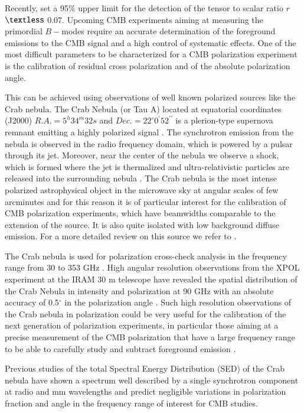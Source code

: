 \documentclass[twocolumn,traditabstract]{aa}
\begin{document}
Recently, \citet{bicepplanck2015,bicep2016} set a 95\% upper limit for the
detection of the tensor to scalar ratio $r$ $\textless$ 0.07.  Upcoming CMB
experiments aiming at measuring the primordial $B-$modes require an accurate
determination of the foreground emissions to the CMB signal and a high control
of systematic effects. One of the most difficult parameters to be characterized for
a CMB polarization experiment is the calibration of residual cross polarization
and of the absolute polarization angle.

This can be achieved using observations of well known polarized sources like the
Crab nebula. The Crab Nebula (or Tau A) located at equatorial coordinates (J2000)
$R.A. = 5^h34^m32s$ and $Dec. = 22^{\circ}0^{\prime}52^{\prime\prime}$ is a
plerion-type supernova remnant emitting a highly polarized signal
\citep{1978A&A....70..419W,1991ApJ...368..463M}.  The synchrotron emission from
the nebula is observed in the radio frequency domain, which is powered by a
pulsar through its jet.  Moreover, near the center of the nebula we observe a
shock, which is formed where the jet is thermalized and ultra-relativistic
particles are released into the surrounding nebula
\citep{2000ApJ...536L..81W,2011A&A...528A..11W}. The Crab nebula is the most
intense polarized astrophysical object in the microwave sky at angular scales of
few arcminutes and for this reason it is of particular interest for the
calibration of CMB polarization experiments, which have beamwidths comparable to
the extension of the source. It is also quite isolated with low
  background diffuse emission. For a more detailed review on this source we refer
to \citet{2008ARA&A..46..127H}.

The Crab nebula is used for polarization cross-check analysis in the frequency
range from 30 to 353 GHz \citep{2011ApJS..192...19W,2015arXiv150702058P}. High
angular resolution observations from the XPOL experiment \citep{thum2008} at the
IRAM 30 m telescope have revealed the spatial distribution of the Crab Nebula in
intensity and polarization at 90 GHz with an absolute accuracy of 0.5$^{\circ}$
in the polarization angle \citep{aumont2010}. Such high resolution observations
of the Crab nebula in polarization could be very useful for the calibration of
the next generation of polarization experiments, in particular those aiming at a
precise measurement of the CMB polarization that have a large frequency range
to be able to carefully study and subtract foreground emission
\citep{2016IJMPD..2540008K}.

Previous studies \citep{macias2010} of the total Spectral Energy Distribution
(SED) of the Crab nebula have shown a spectrum well described by a single
synchrotron component at radio and mm wavelengths and predict negligible
variations in polarization fraction and angle in the frequency range of interest
for CMB studies.
 
\end{document}
